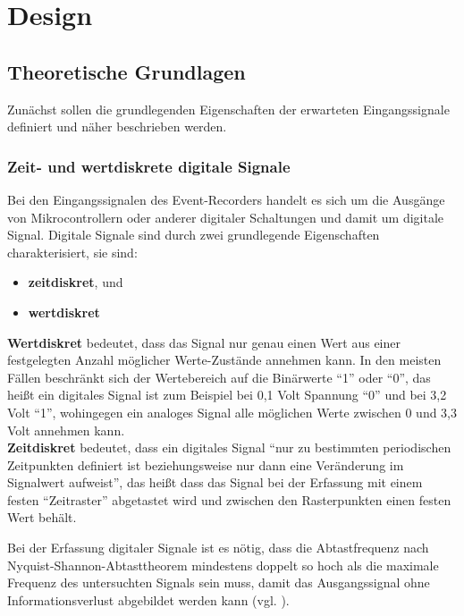 \chapter{Design}
\label{ch:Design}

\section{Theoretische Grundlagen}

Zunächst sollen die grundlegenden Eigenschaften der erwarteten Eingangssignale definiert und näher beschrieben werden. 

\subsection{Zeit- und wertdiskrete digitale Signale}

Bei den Eingangssignalen des Event-Recorders handelt es sich um die Ausgänge von Mikrocontrollern oder anderer digitaler Schaltungen und damit um digitale Signal.
Digitale Signale sind durch zwei grundlegende Eigenschaften charakterisiert, sie sind:
\begin{itemize}
	\item \textbf{zeitdiskret}, und
	\item \textbf{wertdiskret}
\end{itemize}
\textbf{Wertdiskret} bedeutet, dass das Signal nur genau einen Wert aus einer festgelegten Anzahl möglicher Werte-Zustände annehmen kann.
In den meisten Fällen beschränkt sich der Wertebereich auf die Binärwerte ``1'' oder ``0'', das heißt ein digitales Signal ist zum Beispiel bei 0,1 Volt Spannung ``0'' und bei 3,2 Volt ``1'', wohingegen ein analoges Signal alle möglichen Werte zwischen 0 und 3,3 Volt annehmen kann.\\

\textbf{Zeitdiskret} bedeutet, dass ein digitales Signal ``nur zu bestimmten periodischen Zeitpunkten definiert ist beziehungsweise nur dann eine Veränderung im Signalwert aufweist''\cite{wiki:Digitalsignal}, das heißt dass das Signal bei der Erfassung mit einem festen ``Zeitraster'' abgetastet wird und zwischen den Rasterpunkten einen festen Wert behält.

Bei der Erfassung digitaler Signale ist es nötig, dass die Abtastfrequenz nach Nyquist-Shannon-Abtasttheorem mindestens doppelt so hoch als die maximale Frequenz des untersuchten Signals sein muss, damit das Ausgangssignal ohne Informationsverlust abgebildet werden kann (vgl. \cite{wiki:Digitalsignal}).

